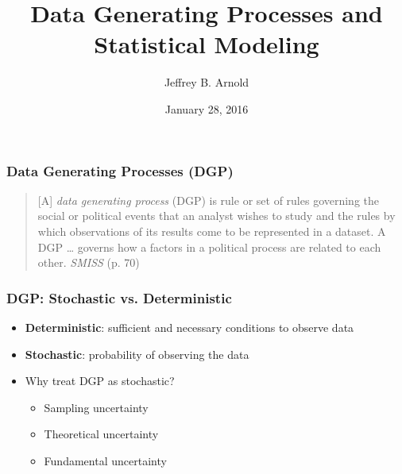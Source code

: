 \documentclass{beamer}
\title{Data Generating Processes and Statistical Modeling}
\author{Jeffrey B. Arnold}
\date{January 28, 2016}
\begin{document}
\begin{frame}
  \maketitle{}
\end{frame}

\begin{frame}
  \frametitle{Data Generating Processes (DGP)}

  \begin{center}
  \end{center}

  \begin{quote}
    [A] \textit{data generating process} (DGP) is rule or set of rules governing the social or political events that an analyst wishes to study and the rules by which observations of its results come to be represented in a dataset. A DGP \dots{} governs how a factors in a political process are related to each other. \textit{SMISS} (p. 70)
  \end{quote}

\end{frame}

\begin{frame}
  \frametitle{DGP: Stochastic vs. Deterministic}
  
  \begin{itemize}
  \item \textbf{Deterministic}: sufficient and necessary conditions to observe data
  \item \textbf{Stochastic}: probability of observing the data
  \item Why treat DGP as stochastic?
    \begin{itemize}
    \item Sampling uncertainty
    \item Theoretical uncertainty
    \item Fundamental uncertainty
    \end{itemize}
  \end{itemize}
\end{frame}
\end{document}
